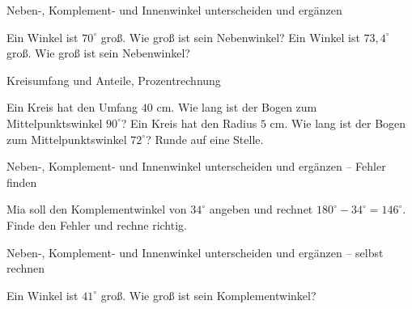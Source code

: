 \begin{aufgabe}{Neben-, Komplement- und Innenwinkel unterscheiden und ergänzen}
\begin{teile}
\teil Ein Winkel ist $70^\circ$ groß. Wie groß ist sein Nebenwinkel? \leerfeld
\teil Ein Winkel ist $73{,}4^\circ$ groß. Wie groß ist sein Nebenwinkel? \leerfeld
\end{teile}
\end{aufgabe}

\begin{aufgabe}{Kreisumfang und Anteile, Prozentrechnung}
\begin{teile}
\teil Ein Kreis hat den Umfang $40$ cm. Wie lang ist der Bogen zum Mittelpunktswinkel $90^\circ$? \leerfeld[cm]
\teil Ein Kreis hat den Radius $5$ cm. Wie lang ist der Bogen zum Mittelpunktswinkel $72^\circ$? Runde auf eine Stelle. \leerfeld[cm]
\end{teile}
\end{aufgabe}

\begin{aufgabe}{Neben-, Komplement- und Innenwinkel unterscheiden und ergänzen – Fehler finden}
\begin{teile}
\teil Mia soll den Komplementwinkel von $34^\circ$ angeben und rechnet $180^\circ - 34^\circ = 146^\circ$. Finde den Fehler und rechne richtig.
\end{teile}
\end{aufgabe}

\begin{aufgabe}{Neben-, Komplement- und Innenwinkel unterscheiden und ergänzen – selbst rechnen}
\begin{teile}
\teil Ein Winkel ist $41^\circ$ groß. Wie groß ist sein Komplementwinkel? \leerfeld
\end{teile}
\end{aufgabe}
